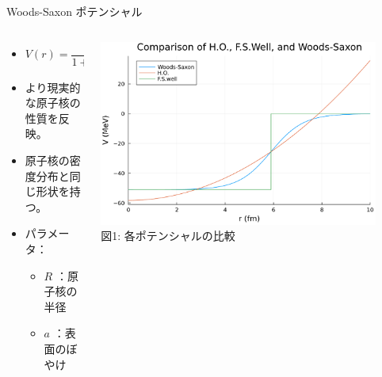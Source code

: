 \documentclass[aspectratio=169, 12pt, dvipdfmx]{beamer}
\begin{document}
\begin{frame}{Woods-Saxon ポテンシャル}
  \begin{columns}[totalwidth=1.0\linewidth]
    \begin{column}[t]{0.45\linewidth}
      \begin{itemize}
        \item $V(r)=\dfrac{V_0(< 0)}{1+\exp((r-R)/a)}$
        \item より現実的な原子核の性質を反映。
        \item 原子核の密度分布と同じ形状を持つ。
        \item パラメータ：
          \begin{itemize}
            \item \( R \) ：原子核の半径
            \item \( a \) ：表面のぼやけ
          \end{itemize}
      \end{itemize}
    \end{column}

    \begin{column}[T]{0.55\linewidth}
      \centering
      \includegraphics[width=0.9\textwidth]{Comp_pt.pdf}
      \vspace{5pt}
      \scriptsize \\図1: 各ポテンシャルの比較
    \end{column}
  \end{columns}
\end{frame}
\end{document}
